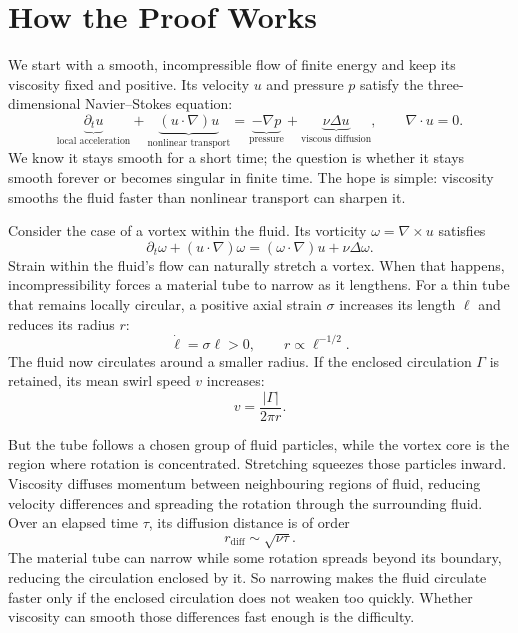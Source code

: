 \begingroup
\setlength{\parindent}{0pt}
\setlength{\parskip}{0.40\baselineskip}
\setlength{\abovedisplayskip}{6.5pt plus 1.5pt minus 1.5pt}
\setlength{\belowdisplayskip}{6.5pt plus 1.5pt minus 1.5pt}
\setlength{\jot}{5pt}

\section*{How the Proof Works}

We start with a smooth, incompressible flow of finite energy and keep its
viscosity fixed and positive. Its velocity \(u\) and pressure \(p\) satisfy
the three-dimensional Navier--Stokes equation:
\[
 \underbrace{\partial_tu}_{\text{local acceleration}}
 +\underbrace{(u\!\cdot\nabla)u}_{\text{nonlinear transport}}
 =\underbrace{-\nabla p}_{\text{pressure}}
 +\underbrace{\nu\Delta u}_{\text{viscous diffusion}},
 \qquad \nabla\!\cdot u=0.
\]
We know it stays smooth for a short time; the question is whether it stays
smooth forever or becomes singular in finite time. The hope is simple:
viscosity smooths the fluid faster than nonlinear transport can sharpen it.

Consider the case of a vortex within the fluid. Its vorticity
\(\omega=\nabla\times u\) satisfies
\[
 \partial_t\omega+(u\cdot\nabla)\omega
 =(\omega\cdot\nabla)u+\nu\Delta\omega.
\]
Strain within the fluid's flow can naturally stretch a vortex. When that
happens, incompressibility forces a material tube to narrow as it lengthens.
For a thin tube that remains locally circular, a positive axial strain
\(\sigma\) increases its length \(\ell\) and reduces its radius \(r\):
\[
 \dot\ell=\sigma\ell>0,
 \qquad r\propto\ell^{-1/2}.
\]
The fluid now circulates around a smaller radius. If the enclosed circulation
\(\Gamma\) is retained, its mean swirl speed \(v\) increases:
\[
 v=\frac{|\Gamma|}{2\pi r}.
\]

But the tube follows a chosen group of fluid particles, while the vortex
core is the region where rotation is concentrated. Stretching squeezes
those particles inward. Viscosity diffuses momentum between neighbouring
regions of fluid, reducing velocity differences and spreading the rotation
through the surrounding fluid. Over an elapsed time \(\tau\), its diffusion
distance is of order
\[
 r_{\mathrm{diff}}\sim\sqrt{\nu\tau}.
\]
The material tube can narrow while some rotation spreads beyond its boundary,
reducing the circulation enclosed by it. So narrowing makes the fluid
circulate faster only if the enclosed circulation does not weaken too
quickly. Whether viscosity can smooth those differences fast enough is the
difficulty.

